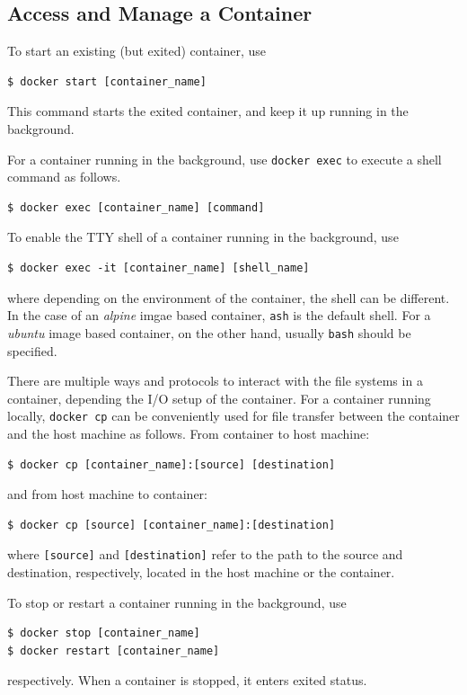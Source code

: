 \subsection{Access and Manage a Container}

To start an existing (but exited) container, use
\begin{lstlisting}
$ docker start [container_name]
\end{lstlisting}
This command starts the exited container, and keep it up running in the background.

For a container running in the background, use \verb|docker exec| to execute a shell command as follows.
\begin{lstlisting}
$ docker exec [container_name] [command]
\end{lstlisting}

To enable the TTY shell of a container running in the background, use
\begin{lstlisting}
$ docker exec -it [container_name] [shell_name]
\end{lstlisting}
where depending on the environment of the container, the shell can be different. In the case of an \textit{alpine} imgae based container, \verb|ash| is the default shell. For a \textit{ubuntu} image based container, on the other hand, usually \verb|bash| should be specified.

There are multiple ways and protocols to interact with the file systems in a container, depending the I/O setup of the container. For a container running locally, \verb|docker cp| can be conveniently used for file transfer between the container and the host machine as follows. From container to host machine:
\begin{lstlisting}
$ docker cp [container_name]:[source] [destination]
\end{lstlisting}
and from host machine to container:
\begin{lstlisting}
$ docker cp [source] [container_name]:[destination]
\end{lstlisting}
where \verb|[source]| and \verb|[destination]| refer to the path to the source and destination, respectively, located in the host machine or the container.

To stop or restart a container running in the background, use
\begin{lstlisting}
$ docker stop [container_name]
$ docker restart [container_name]
\end{lstlisting}
respectively. When a container is stopped, it enters exited status.

